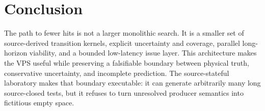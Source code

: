 \documentclass[10pt]{article}
\begin{document}
\section{Conclusion}

The path to fewer hits is not a larger monolithic search.  It is a smaller set
of source-derived transition kernels, explicit uncertainty and coverage,
parallel long-horizon viability, and a bounded low-latency issue layer.  This
architecture makes the VPS useful while preserving a falsifiable boundary
between physical truth, conservative uncertainty, and incomplete prediction.
The source-stateful laboratory makes that boundary executable: it can generate
arbitrarily many long source-closed tests, but it refuses to turn unresolved
producer semantics into fictitious empty space.
\end{document}
